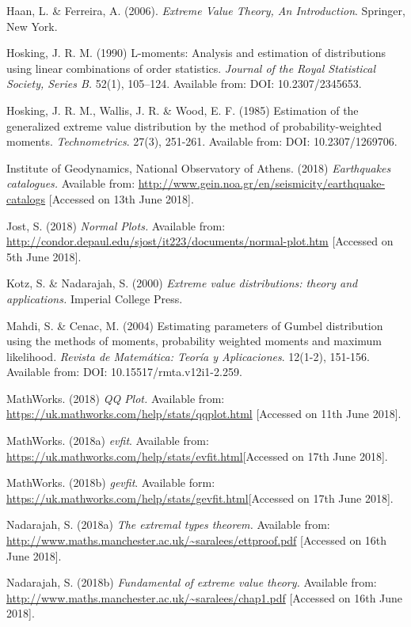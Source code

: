 \documentclass{article}
\begin{document}
Haan, L. \& Ferreira, A. (2006). \textit{Extreme Value Theory, An Introduction}. Springer, New York.


Hosking, J. R. M. (1990) L-moments: Analysis and estimation of distributions using linear combinations of order statistics. \textit{Journal of the Royal Statistical Society, Series B.} 52(1), 105–124. Available from: DOI: 10.2307/2345653.

Hosking, J. R. M., Wallis, J. R. \& Wood, E. F. (1985) Estimation of the generalized 
extreme value distribution by the method of probability-weighted moments. 
\textit{Technometrics}. 27(3), 251-261. Available from: DOI: 10.2307/1269706.

Institute of Geodynamics, National Observatory of Athens. (2018) \textit{Earthquakes catalogues.} Available from: \url{http://www.gein.noa.gr/en/seismicity/earthquake-catalogs} [Accessed on 13th June 2018].

Jost, S. (2018) \textit{Normal Plots.} Available from: \url{http://condor.depaul.edu/sjost/it223/documents/normal-plot.htm} [Accessed on 5th June 2018]. 

Kotz, S. \& Nadarajah, S. (2000) \textit{Extreme value distributions: theory and 
applications.} Imperial College Press. 

Mahdi, S. \& Cenac, M. (2004) Estimating parameters of Gumbel distribution using the 
methods of moments, probability weighted moments and maximum likelihood. \textit{Revista
de Matemática: Teoría y Aplicaciones}. 12(1-2), 151-156. Available from: DOI: 10.15517/rmta.v12i1-2.259.

MathWorks. (2018) \textit{QQ Plot.} Available from:
\url{https://uk.mathworks.com/help/stats/qqplot.html} [Accessed on 11th June 2018].

MathWorks. (2018a) \textit{evfit}. Available from: \url{https://uk.mathworks.com/help/stats/evfit.html}[Accessed on 17th June 2018].

MathWorks. (2018b) \textit{gevfit}. Available form: \url{https://uk.mathworks.com/help/stats/gevfit.html}[Accessed on 17th June 2018].

Nadarajah, S. (2018a) \textit{The extremal types theorem.} Available from: \url{http://www.maths.manchester.ac.uk/~saralees/ettproof.pdf} [Accessed on 16th June 2018].

Nadarajah, S. (2018b) \textit{Fundamental of extreme value theory.} Available from: \url{http://www.maths.manchester.ac.uk/~saralees/chap1.pdf} [Accessed on 16th June 2018].
\end{document}
